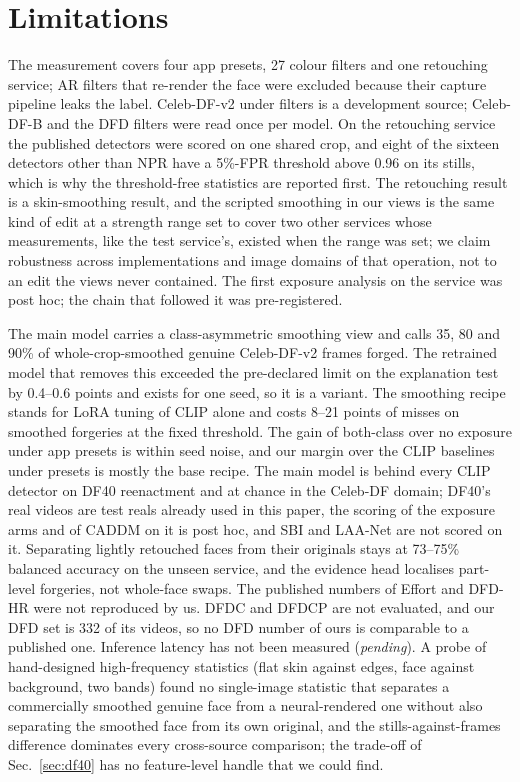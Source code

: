 \documentclass[conference]{IEEEtran}
\begin{document}
\section{Limitations}
The measurement covers four app presets, 27 colour filters and one retouching service; AR filters that re-render the
face were excluded because their capture pipeline leaks the label. Celeb-DF-v2 under filters is a development source;
Celeb-DF-B and the DFD filters were read once per model. On the retouching service the published detectors were scored
on one shared crop, and eight of the sixteen detectors other than NPR have a 5\%-FPR threshold above 0.96 on its stills, which
is why the threshold-free statistics are reported first. The retouching result is a skin-smoothing result, and the
scripted smoothing in our views is the same kind of edit at a strength range set to cover two other services whose
measurements, like the test service's, existed when the range was set; we claim robustness across implementations and
image domains of that operation, not to an edit the views never contained. The first exposure analysis on the service
was post hoc; the chain that followed it was pre-registered.

The main model carries a class-asymmetric smoothing view and calls 35, 80 and 90\% of whole-crop-smoothed genuine
Celeb-DF-v2 frames forged. The retrained model that removes this exceeded the pre-declared limit on the explanation
test by 0.4--0.6 points and exists for one seed, so it is a variant. The smoothing recipe stands for LoRA tuning of
CLIP alone and costs 8--21 points of misses on smoothed forgeries at the fixed threshold. The gain of both-class over
no exposure under app presets is within seed noise, and our margin over the CLIP baselines under presets is mostly the
base recipe. The main model is behind every CLIP detector on DF40 reenactment and at chance in the Celeb-DF domain;
DF40's real videos are test reals already used in this paper, the scoring of the exposure arms and of CADDM on it is
post hoc, and SBI and LAA-Net are not scored on it.
Separating lightly retouched faces from their originals stays at 73--75\% balanced accuracy on the unseen service, and
the evidence head localises part-level forgeries, not whole-face swaps. The published numbers of Effort and DFD-HR
were not reproduced by us. DFDC and DFDCP are not evaluated, and our DFD set is 332 of its videos, so no DFD number of
ours is comparable to a published one. Inference latency has not been measured (\textit{pending}). A probe of
hand-designed high-frequency statistics (flat skin against edges, face against background, two bands) found no
single-image statistic that separates a commercially smoothed genuine face from a neural-rendered one without also
separating the smoothed face from its own original, and the stills-against-frames difference dominates every
cross-source comparison; the trade-off of Sec.~\ref{sec:df40} has no feature-level handle that we could find.
\end{document}
